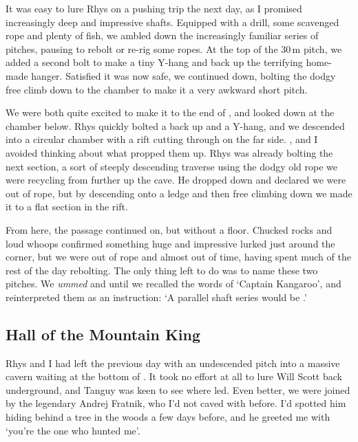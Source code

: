 It was easy to lure Rhys on a pushing trip the next day, as I promised increasingly deep and impressive shafts. Equipped with a drill, some scavenged rope and plenty of fish, we ambled down the increasingly familiar series of pitches, pausing to rebolt or re-rig some ropes. At the top of the 30\,m  pitch, we added a second bolt to make a tiny Y-hang and back up the terrifying home-made hanger. Satisfied it was now safe, we continued down, bolting the dodgy free climb down to the  chamber to make it a very awkward short pitch.
 
We were both quite excited to make it to the end of , and looked down at the chamber below. Rhys quickly bolted a back up and a Y-hang, and we descended into a circular chamber with a rift cutting through on the far side. , and I avoided thinking about what propped them up. Rhys was already bolting the next section, a sort of steeply descending traverse using the dodgy old rope we were recycling from further up the cave. He dropped down and declared we were out of rope, but by descending onto a ledge and then free climbing down we made it to a flat section in the rift.
 
From here, the passage continued on, but without a floor. Chucked rocks and loud whoops confirmed something huge and impressive lurked just around the corner, but we were out of rope and almost out of time, having spent much of the rest of the day rebolting. The only thing left to do was to name these two pitches. We \emph{ummed} and  until we recalled the words of `Captain Kangaroo', and reinterpreted them as an instruction: `A parallel shaft series would be .'

\subsection{Hall of the Mountain King}
    
Rhys and I had left the previous day with an undescended pitch into a massive cavern waiting at the bottom of . It took no effort at all to lure Will Scott back underground, and Tanguy was keen to see where  led. Even better, we were joined by the legendary Andrej Fratnik, who I'd not caved with before. I'd spotted him hiding behind a tree in the woods a few days before, and he greeted me with `you're the one who hunted me'.
 
